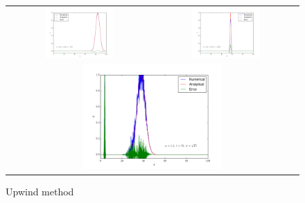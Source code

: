 \documentclass[11pt,letterpaper]{article}
\begin{document}
\begin{figure}[bth]
\centering
\begin{tabular}{cc}
    \includegraphics[width={0.49\textwidth}]{fig1.pdf} &
    \includegraphics[width={0.49\textwidth}]{fig2.pdf} \\
    \multicolumn{2}{c}{ 
    	\includegraphics[width={0.49\textwidth}]{fig3.pdf}
    } \\
\end{tabular}
\caption{Upwind method}
\label{fig1}
\end{figure}
\end{document}
